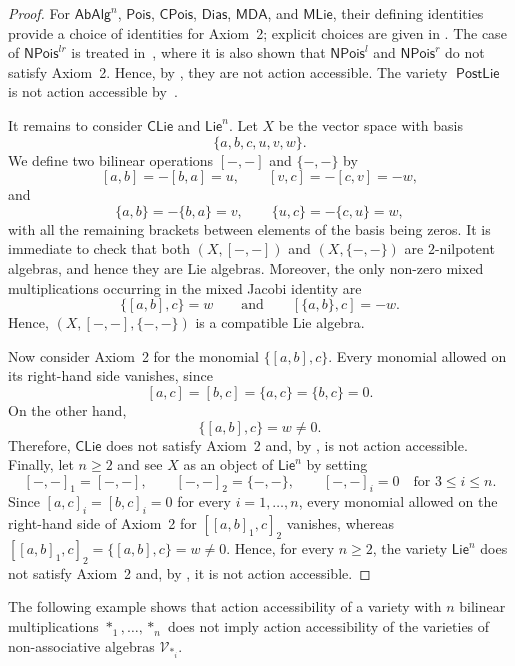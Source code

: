 \documentclass[reqno,a4paper]{amsart}
\theoremstyle{plain}
\theoremstyle{definition}
\theoremstyle{remark}
\numberwithin{equation}{section}
\newcommand{\V}{\mathcal{V}}
\newcommand{\Lie}{\ensuremath{\mathsf{Lie}}}
\newcommand{\Pois}{\ensuremath{\mathsf{Pois}}}
\newcommand{\CPois}{\ensuremath{\mathsf{CPois}}}
\newcommand{\AbAlg}{\ensuremath{\mathsf{AbAlg}}}
\newcommand{\NP}{\ensuremath{\mathsf{NPois}}}
\newcommand{\Match}{\ensuremath{\mathsf{MDA}}}
\newcommand{\Dias}{\ensuremath{\mathsf{Dias}}}
\newcommand{\CLie}{\ensuremath{\mathsf{CLie}}}
\newcommand{\MatchLie}{\ensuremath{\mathsf{MLie}}}
\newcommand{\PostLie}{\operatorname{\mathsf{PostLie}}}
\begin{document}
\begin{proof}
For $\AbAlg^n$, $\Pois$, $\CPois$, $\Dias$, $\Match$, and $\MatchLie$, their defining identities provide a choice of identities for Axiom~2; explicit choices are given in . The case of $\NP^{lr}$ is treated in~\cite[Example~2.5]{CasasDatuashviliLadraNPLR}, where it is also shown that $\NP^l$ and $\NP^r$ do not satisfy Axiom~2. Hence, by , they are not action accessible. The variety $\PostLie$ is not action accessible by~\cite[Proposition~3.5]{AlbanoStefanelli}. 

It remains to consider $\CLie$ and $\Lie^n$. Let $X$ be the vector space with basis
\[
\{a,b,c,u,v,w\}.
\]
We define two bilinear operations $[-,-]$ and $\{-,-\}$ by
\[
[a,b]=-[b,a]=u,
\qquad
[v,c]=-[c,v]=-w,
\]
and
\[
\{a,b\}=-\{b,a\}=v,
\qquad
\{u,c\}=-\{c,u\}=w,
\]
with all the remaining brackets between elements of the basis being zeros. It is immediate to check that both $(X,[-,-])$ and $(X,\{-,-\})$ are $2$-nilpotent algebras, and hence they are Lie algebras. Moreover, the only non-zero mixed multiplications occurring in the mixed Jacobi identity are
\[
\{[a,b],c\}=w
\qquad\text{and}\qquad
[\{a,b\},c]=-w.
\]
Hence, $(X,[-,-],\{-,-\})$ is a compatible Lie algebra.

Now consider Axiom~2 for the monomial $\{[a,b],c\}$. Every monomial allowed on its right-hand side vanishes, since
\[
[a,c]=[b,c]=\{a,c\}=\{b,c\}=0.
\]
On the other hand,
\[
\{[a,b],c\}=w\neq0.
\]
Therefore, $\CLie$ does not satisfy Axiom~2 and, by , is not action accessible. Finally, let $n\geq2$ and see $X$ as an object of $\Lie^n$ by setting
\[
[-,-]_1=[-,-],
\qquad
[-,-]_2=\{-,-\},
\qquad
[-,-]_i=0
\quad\text{for }3\leq i\leq n .
\]
Since $[a,c]_i=[b,c]_i=0$ for every $i=1,\ldots,n$, every monomial allowed on the right-hand side of Axiom~2 for $[[a,b]_1,c]_2$ vanishes, whereas $[[a,b]_1,c]_2=\{[a,b],c\}=w\neq0$. Hence, for every $n\geq2$, the variety $\Lie^n$ does not satisfy Axiom~2 and, by , it is not action accessible.
\end{proof}

The following example shows that action accessibility of a variety with $n$ bilinear multiplications $\ast_1,\ldots,\ast_n$ does not imply action accessibility of the varieties of non-associative algebras $\V_{\ast_i}$.
\end{document}
